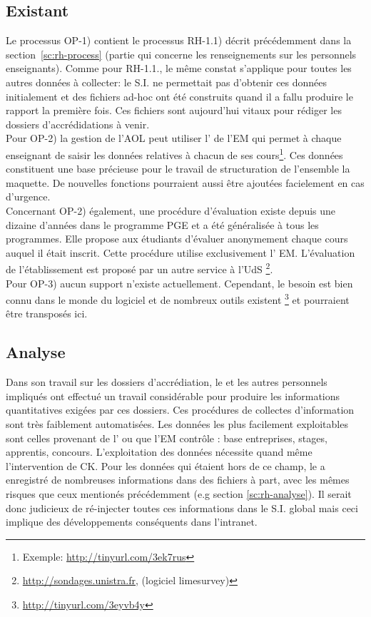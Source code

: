 \documentclass{book}
\begin{document}
\subsection{Existant}

Le processus OP-1) contient le processus RH-1.1) décrit précédemment dans la 
section~\ref{sc:rh-process} (partie qui concerne les renseignements sur les
personnels enseignants). Comme pour RH-1.1., le même constat s'applique pour 
toutes les autres données à collecter: le S.I. ne permettait pas d'obtenir ces 
données initialement et des fichiers ad-hoc ont été construits quand il a fallu 
produire le rapport la première fois. Ces fichiers sont aujourd'hui vitaux pour
rédiger les dossiers d'accrédidations à venir.\\

Pour OP-2) la gestion de l'AOL peut utiliser l' de l'EM qui
permet à chaque enseignant de saisir les données relatives à chacun de ses 
cours\footnote{Exemple: \url{http://tinyurl.com/3ek7rus}}. Ces données 
constituent une base précieuse pour le travail de structuration de l'ensemble
la maquette. De nouvelles fonctions pourraient aussi être ajoutées facielement
en cas d'urgence.\\

Concernant OP-2) également, une procédure d'évaluation existe depuis une dizaine 
d'années dans le programme PGE et a été généralisée à tous les programmes. Elle 
propose aux étudiants d'évaluer anonymement chaque cours auquel il était inscrit. 
Cette procédure utilise exclusivement l' EM.
L'évaluation de l'établissement est proposé par un autre service à l'UdS%
\footnote{\url{http://sondages.unistra.fr}, (logiciel limesurvey)}.\\

Pour OP-3) aucun support n'existe actuellement. Cependant, le besoin est
bien connu dans le monde du logiciel et de nombreux outils existent%
\footnote{\url{http://tinyurl.com/3eyvb4y}}
et pourraient être transposés ici.


\subsection{Analyse}

Dans son travail sur les dossiers d'accrédiation, le \sop et les autres
personnels impliqués ont effectué un travail considérable pour produire
les informations quantitatives exigées par ces dossiers. Ces procédures
de collectes d'information sont très faiblement automatisées. Les données
les plus facilement exploitables sont celles provenant de l'
ou que l'EM contrôle : base entreprises, stages, apprentis, concours. 
L'exploitation des données nécessite quand même l'intervention de CK. 
Pour les données qui étaient hors de ce champ, le \sop a enregistré de
nombreuses informations dans des fichiers à part, avec les mêmes risques
que ceux mentionés précédemment (e.g section \ref{sc:rh-analyse}). 
Il serait donc judicieux de ré-injecter toutes ces informations dans le S.I.
global mais ceci implique des développements conséquents dans l'intranet.\\
\end{document}
